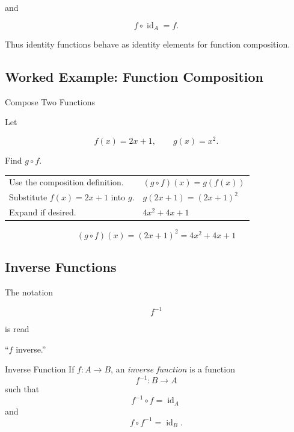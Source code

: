 and

\[ f\circ\operatorname{id}_A=f. \]

Thus identity functions behave as identity elements for function composition.

\subsection{Worked Example: Function Composition}
\label{subsec:worked-function-composition}

\begin{workedexamplebox}{Compose Two Functions}

Let

\[ f(x)=2x+1,\qquad g(x)=x^2. \]

Find \(g\circ f\).

\begin{tabularx}{\textwidth}{@{}>{\raggedright\arraybackslash}p{}X@{}}
Use the composition definition. & \((g\circ f)(x)=g(f(x))\)\\
Substitute \(f(x)=2x+1\) into \(g\). & \(g(2x+1)=(2x+1)^2\)\\
Expand if desired. & \(4x^2+4x+1\)
\end{tabularx}

\begin{answerbox}
\[ (g\circ f)(x)=(2x+1)^2=4x^2+4x+1 \]
\end{answerbox}
\end{workedexamplebox}

\subsection{Inverse Functions}
\label{subsec:inverse-functions}

The notation

\[ f^{-1} \]

is read

\begin{center}
``\(f\) inverse.''
\end{center}

\begin{definitionbox}{Inverse Function}
If \(f:A\to B\), an \emph{inverse function} is a function
\[ f^{-1}:B\to A \]
such that
\[ f^{-1}\circ f=\operatorname{id}_A \]
and
\[ f\circ f^{-1}=\operatorname{id}_B. \]
\end{definitionbox}

